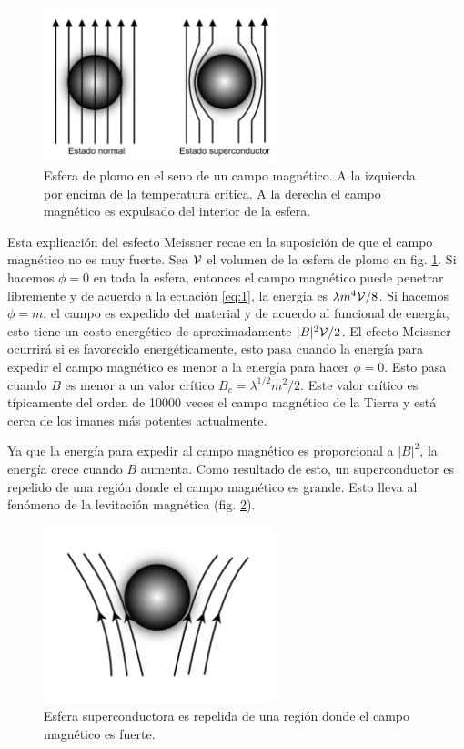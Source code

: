 \begin{figure}[ht]
	\centering
	\includegraphics[width=0.6\textwidth]{gfx/superconductingsphere.png}
	\caption{Esfera de plomo en el seno de un campo magnético. A la izquierda por encima de la temperatura crítica. A la derecha el campo magnético es expulsado del interior de la esfera.}
	\label{fig:1}
\end{figure}

Esta explicación del esfecto Meissner recae en la suposición de que el campo magnético no es muy fuerte. Sea $\mathcal{V}$ el volumen de la esfera de plomo en fig. \ref{fig:1}. Si hacemos $\phi=0$ en toda la esfera, entonces el campo magnético puede penetrar libremente y de acuerdo a la ecuación \eqref{eq:1}, la energía es $\lambda m^4\mathcal{V}/8$. Si hacemos $\phi=m$, el campo es expedido del material y de acuerdo al funcional de energía, esto tiene un costo energético de aproximadamente $|B|^2\mathcal{V}/2$. El efecto Meissner ocurrirá si es favorecido energéticamente, esto pasa cuando la energía para expedir el campo magnético es menor a la energía para hacer $\phi=0$. Esto pasa cuando $B$ es menor a un valor crítico $B_{c}=\lambda^{1/2}m^2/2$. Este valor crítico es típicamente del orden de 10000 veces el campo magnético de la Tierra y está cerca de los imanes más potentes actualmente.

Ya que la energía para expedir al campo magnético es proporcional a $|B|^2$, la energía crece cuando $B$ aumenta. Como resultado de esto, un superconductor es repelido de una región donde el campo magnético es grande. Esto lleva al fenómeno de la levitación magnética (fig. \ref{fig:2}).

\begin{figure}[ht]
	\centering
	\includegraphics[width=0.6\textwidth]{gfx/maglev.png}
	\caption{Esfera superconductora es repelida de una región donde el campo magnético es fuerte.}
	\label{fig:2}
\end{figure}

